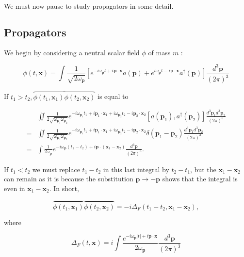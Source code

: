 \documentclass[10pt, letterpaper]{article}
\begin{document}
We must now pause to study propagators in some detail.

\subsection*{Propagators}
We begin by considering a neutral scalar field $\phi$ of mass $m$ :

$$
\phi(t, \mathbf{x})=\int \frac{1}{\sqrt{2 \omega_{\mathbf{p}}}}\left[e^{-i \omega_{\mathbf{p}} t+i \mathbf{p} \cdot \mathbf{x}} a(\mathbf{p})+e^{i \omega_{\mathbf{p}} t-i \mathbf{p} \cdot \mathbf{x}} a^{\dagger}(\mathbf{p})\right] \frac{d^{3} \mathbf{p}}{(2 \pi)^{3}}
$$

If $t_{1}>t_{2}, \overbrace{\phi\left(t_{1}, \mathbf{x}_{1}\right) \phi\left(t_{2}, \mathbf{x}_{2}\right)}$ is equal to

$$
\begin{aligned}
& \iint \frac{1}{2 \sqrt{\omega_{\mathbf{p}_{1}} \omega_{\mathbf{p}_{2}}}} e^{-i \omega_{\mathbf{p}_{1}} t_{1}+i \mathbf{p}_{1} \cdot \mathbf{x}_{1}+i \omega_{\mathbf{p}_{2}} t_{2}-i \mathbf{p}_{2} \cdot \mathbf{x}_{2}}\left[a\left(\mathbf{p}_{1}\right), a^{\dagger}\left(\mathbf{p}_{2}\right)\right] \frac{d^{3} \mathbf{p}_{1} d^{3} \mathbf{p}_{2}}{(2 \pi)^{6}} \\
= & \iint \frac{1}{2 \sqrt{\omega_{\mathbf{p}_{1}} \omega_{\mathbf{p}_{2}}}} e^{-i \omega_{\mathbf{p}_{1}} t_{1}+i \mathbf{p}_{1} \cdot \mathbf{x}_{1}+i \omega_{\mathbf{p}_{2}} t_{2}-i \mathbf{p}_{2} \cdot \mathbf{x}_{2}} \delta\left(\mathbf{p}_{1}-\mathbf{p}_{2}\right) \frac{d^{3} \mathbf{p}_{1} d^{3} \mathbf{p}_{2}}{(2 \pi)^{3}} \\
= & \int \frac{1}{2 \omega_{\mathbf{p}}} e^{-i \omega_{\mathbf{p}}\left(t_{1}-t_{2}\right)+i \mathbf{p} \cdot\left(\mathbf{x}_{1}-\mathbf{x}_{2}\right)} \frac{d^{3} \mathbf{p}}{(2 \pi)^{3}} .
\end{aligned}
$$

If $t_{1}<t_{2}$ we must replace $t_{1}-t_{2}$ in this last integral by $t_{2}-t_{1}$, but the $\mathbf{x}_{1}-\mathbf{x}_{2}$ can remain as it is because the substitution $\mathbf{p} \rightarrow-\mathbf{p}$ shows that the integral is even in $\mathbf{x}_{1}-\mathbf{x}_{2}$. In short,

$$
\overbrace{\phi\left(t_{1}, \mathbf{x}_{1}\right) \phi\left(t_{2}, \mathbf{x}_{2}\right)}=-i \Delta_{F}\left(t_{1}-t_{2}, \mathbf{x}_{1}-\mathbf{x}_{2}\right),
$$

where

$$
\Delta_{F}(t, \mathbf{x})=i \int \frac{e^{-i \omega_{\mathbf{p}}|t|+i \mathbf{p} \cdot \mathbf{x}}}{2 \omega_{\mathbf{p}}} \frac{d^{3} \mathbf{p}}{(2 \pi)^{3}}
$$
\end{document}
